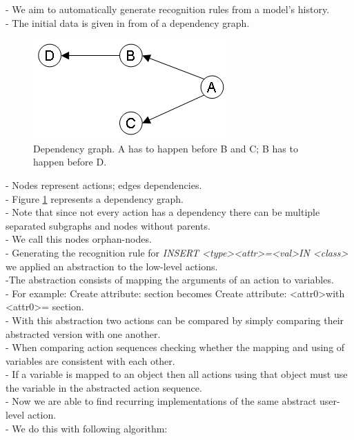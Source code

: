 \documentclass[10pt,a4paper,oneside]{scrartcl}
\begin{document}
	- We aim to automatically generate recognition rules from a model's history.
	\\
	- The initial data is given in from of a dependency graph.
	\\
	\begin{figure}
		\centering
		\includegraphics{./res/Dependencygraph.png}
		\caption{Dependency graph. A has to happen before B and C; B has to happen before D.}
		\label{fig:depgraph}
	\end{figure}
	- Nodes represent actions; edges dependencies.
	\\
	- Figure \ref{fig:depgraph} represents a dependency graph.
	\\
	- Note that since not every action has a dependency there can be multiple separated subgraphs and nodes without parents. 
	\\
	- We call this nodes orphan-nodes.
	\\
	- Generating the recognition rule for \textit{INSERT \textless type\textgreater \textless attr\textgreater=\textless val\textgreater IN \textless class\textgreater} we applied an abstraction to the low-level actions.
	\\
	-The abstraction consists of mapping the arguments of an action to variables.
	\\
	- For example: Create attribute: section becomes Create attribute: \textless attr0\textgreater with \textless attr0\textgreater = section.
	\\
	- With this abstraction two actions can be compared by simply comparing their abstracted version with one another.
	\\
	- When comparing action sequences checking whether the mapping and using of variables are consistent with each other.
	\\
	- If a variable is mapped to an object then all actions using that object must use the variable in the abstracted action sequence.
	\\
	- Now we are able to find recurring implementations of the same abstract user-level action.
	\\
	- We do this with following algorithm:
\end{document}
